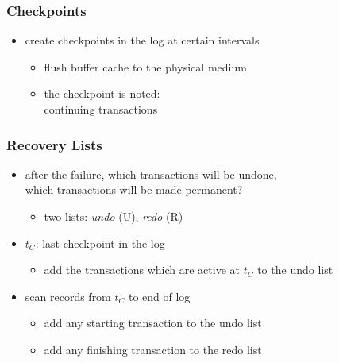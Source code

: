 \documentclass[dvipsnames]{beamer}
\theoremstyle{plain}
\begin{document}
\begin{frame}
  \frametitle{Checkpoints}

  \begin{itemize}
    \item create \alert{checkpoints} in the log at certain intervals
    \begin{itemize}
      \item flush buffer cache to the physical medium
      \item the checkpoint is noted:\\
        continuing transactions
    \end{itemize}
  \end{itemize}
\end{frame}

\begin{frame}
  \frametitle{Recovery Lists}

  \begin{itemize}
    \item after the failure, which transactions will be undone,\\
      which transactions will be made permanent?
    \begin{itemize}
      \item two lists: \emph{undo} (U), \emph{redo} (R)
    \end{itemize}

    \pause
    \item $t_C$: last checkpoint in the log
    \begin{itemize}
      \item add the transactions which are active at $t_C$ to the undo list
    \end{itemize}

    \pause
    \item scan records from $t_C$ to end of log
    \begin{itemize}
      \item add any starting transaction to the undo list
      \item add any finishing transaction to the redo list
    \end{itemize}
  \end{itemize}
\end{frame}
\end{document}
